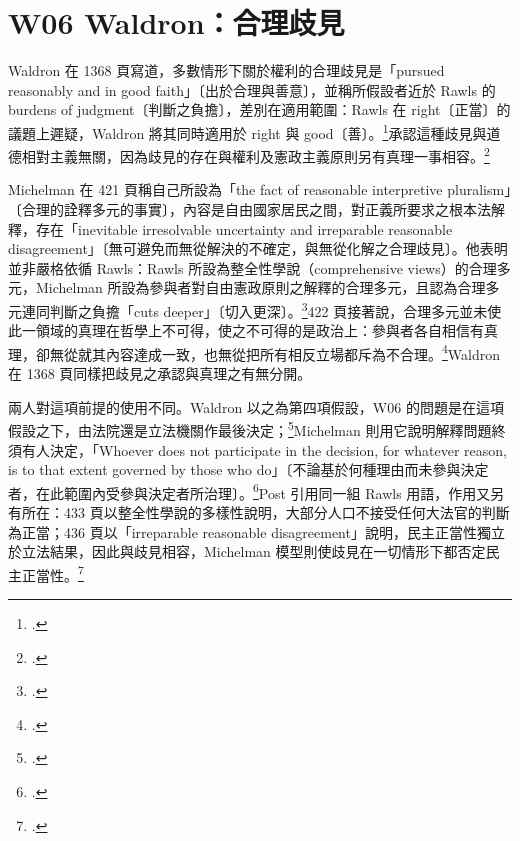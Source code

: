 \section{W06 Waldron：合理歧見}
\label{sec:80_comparison-1}

Waldron 在 1368 頁寫道，多數情形下關於權利的合理歧見是「pursued reasonably and in good faith」〔出於合理與善意〕，並稱所假設者近於 Rawls 的 burdens of judgment〔判斷之負擔〕，差別在適用範圍：Rawls 在 right〔正當〕的議題上遲疑，Waldron 將其同時適用於 right 與 good〔善〕。\footcite[1368 \& n.56]{waldron2006}承認這種歧見與道德相對主義無關，因為歧見的存在與權利及憲政主義原則另有真理一事相容。\footcite[1368]{waldron2006}

Michelman 在 421 頁稱自己所設為「the fact of reasonable interpretive pluralism」〔合理的詮釋多元的事實〕，內容是自由國家居民之間，對正義所要求之根本法解釋，存在「inevitable irresolvable uncertainty and irreparable reasonable disagreement」〔無可避免而無從解決的不確定，與無從化解之合理歧見〕。他表明並非嚴格依循 Rawls：Rawls 所設為整全性學說（comprehensive views）的合理多元，Michelman 所設為參與者對自由憲政原則之解釋的合理多元，且認為合理多元連同判斷之負擔「cuts deeper」〔切入更深〕。\footcite[421 \& nn.65--67]{michelman1998}422 頁接著說，合理多元並未使此一領域的真理在哲學上不可得，使之不可得的是政治上：參與者各自相信有真理，卻無從就其內容達成一致，也無從把所有相反立場都斥為不合理。\footcite[422]{michelman1998}Waldron 在 1368 頁同樣把歧見之承認與真理之有無分開。

兩人對這項前提的使用不同。Waldron 以之為第四項假設，W06 的問題是在這項假設之下，由法院還是立法機關作最後決定；\footcite[1366--1369]{waldron2006}Michelman 則用它說明解釋問題終須有人決定，「Whoever does not participate in the decision, for whatever reason, is to that extent governed by those who do」〔不論基於何種理由而未參與決定者，在此範圍內受參與決定者所治理〕。\footcite[415]{michelman1998}Post 引用同一組 Rawls 用語，作用又另有所在：433 頁以整全性學說的多樣性說明，大部分人口不接受任何大法官的判斷為正當；436 頁以「irreparable reasonable disagreement」說明，民主正當性獨立於立法結果，因此與歧見相容，Michelman 模型則使歧見在一切情形下都否定民主正當性。\footcite[433 n.19, 436 \& n.28]{post1998}

